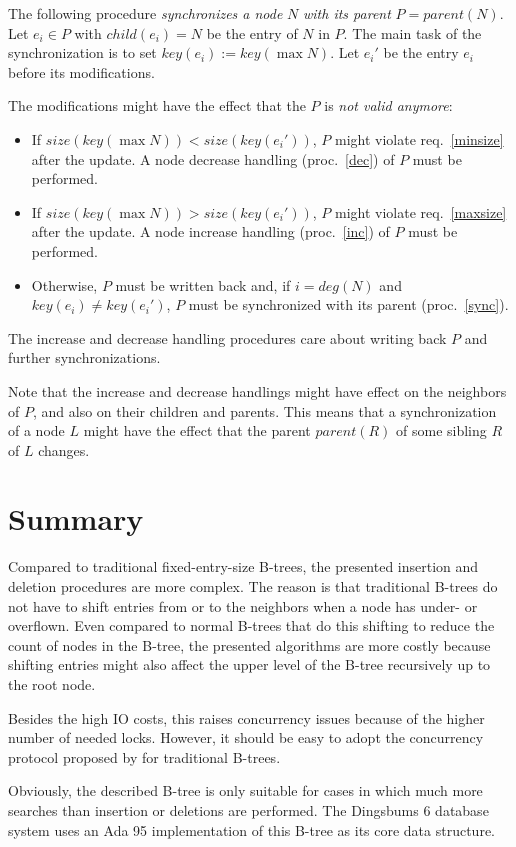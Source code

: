 \documentclass{vldb}
\begin{document}
\begin{proc} \label{sync}
The following procedure {\em synchronizes a node} $N$ {\em with its parent}
$P = parent(N)$.
Let \mbox{$e_i \in P$} with \mbox{$child(e_i) = N$} be the entry of
$N$ in $P$.
The main task of the synchronization is to set \mbox{$key(e_i) := key(\max N)$}.
Let $e_i'$ be the entry $e_i$ before its modifications.

The modifications might have the effect that the $P$ is {\em not valid anymore}:
\begin{itemize}
\item If \mbox{$size(key(\max N)) < size(key(e_i'))$},
    $P$ might violate req.~\ref{minsize} after the update.
    A node decrease handling (proc.~\ref{dec}) of $P$ must be performed.
\item If \mbox{$size(key(\max N)) > size(key(e_i'))$},
    $P$ might violate req.~\ref{maxsize} after the update.
    A node increase handling (proc.~\ref{inc}) of $P$ must be performed.
\item Otherwise, $P$ must be written back and, if $i = deg(N)$ and
    $key(e_i) \neq key(e_i')$, $P$ must be synchronized with its parent
    (proc.~\ref{sync}).
\end{itemize}

The increase and decrease handling procedures care about writing back $P$
and further synchronizations.

Note that the increase and decrease handlings might have effect on the
neighbors of $P$, and also on their children and parents.
This means that a synchronization of a node $L$ might have the effect that
the parent $parent(R)$ of some sibling $R$ of $L$ changes.
\end{proc}



\section{Summary}

Compared to traditional fixed-entry-size B-trees, the
presented insertion and deletion procedures are more complex.
The reason is that traditional B-trees do not have to shift
entries from or to the neighbors when a node has under- or overflown.
Even compared to normal B-trees that do this shifting to
reduce the count of nodes in the B-tree, the presented algorithms are more
costly because shifting entries might also affect the upper level of the B-tree
recursively up to the root node.

Besides the high IO costs, this raises concurrency issues because of the higher
number of needed locks.
However, it should be easy to adopt the concurrency protocol proposed by
\cite{Lehman} for traditional B-trees.

Obviously, the described B-tree is only suitable for cases in
which much more searches than insertion or deletions are performed.
The Dingsbums 6 database system uses an Ada 95 implementation of this
B-tree as its core data structure.




\end{document}
